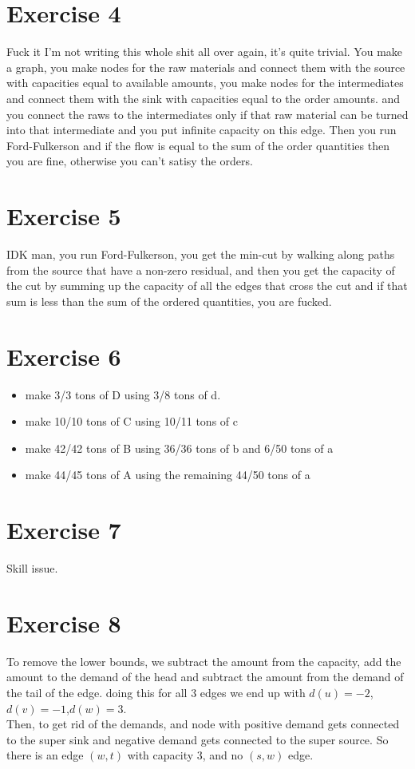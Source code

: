 \documentclass[a4paper,11pt]{article}
\begin{document}
	\section{Exercise 4}
	Fuck it I'm not writing this whole shit all over again, it's quite trivial. You make a graph, you make nodes for the raw materials and connect them with the source with capacities equal to available amounts, you make nodes for the intermediates and connect them with the sink with capacities equal to the order amounts. and you connect the raws to the intermediates only if that raw material can be turned into that intermediate and you put infinite capacity on this edge. Then you run Ford-Fulkerson and if the flow is equal to the sum of the order quantities then you are fine, otherwise you can't satisy the orders.

	\section{Exercise 5}
	IDK man, you run Ford-Fulkerson, you get the min-cut by walking along paths from the source that have a non-zero residual, and then you get the capacity of the cut by summing up the capacity of all the edges that cross the cut and if that sum is less than the sum of the ordered quantities, you are fucked.

	\section{Exercise 6}
	\begin{itemize}
		\item make 3/3 tons of D using 3/8 tons of d.
		\item make 10/10 tons of C using 10/11 tons of c
		\item make 42/42 tons of B using 36/36 tons of b and 6/50 tons of a
		\item make 44/45 tons of A using the remaining 44/50 tons of a
	\end{itemize}

	\section{Exercise 7}
	Skill issue.

	\section{Exercise 8}
	To remove the lower bounds, we subtract the amount from the capacity, add the amount to the demand of the head and subtract the amount from the demand of the tail of the edge. doing this for all 3 edges we end up with $d(u)=-2$,$d(v)=-1$,$d(w)=3$. \\
	Then, to get rid of the demands, and node with positive demand gets connected to the super sink and negative demand gets connected to the super source. So there is an edge $(w,t)$ with capacity 3, and no $(s,w)$ edge.
\end{document}
